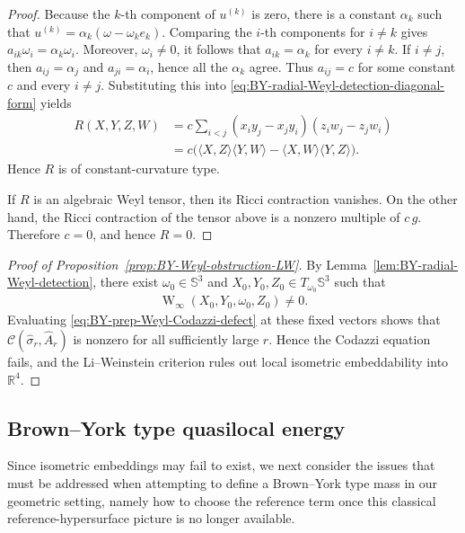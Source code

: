 \documentclass[10pt]{amsart}
\newcommand{\R}{\mathbb{R}}
\newcommand{\Sph}{\mathbb{S}}
\newcommand{\Weyl}{\operatorname{W}}
\theoremstyle{plain}
\theoremstyle{remark}
\begin{document}
\begin{proof}
		Because the $k$-th component of $u^{(k)}$ is zero, there is a constant
		$\alpha_k$ such that $u^{(k)}=\alpha_k(\omega-\omega_k e_k)$. Comparing
		the $i$-th components for $i\neq k$ gives
		$a_{ik}\omega_i=\alpha_k\omega_i$. Moreover, $\omega_i\neq0$, it follows
		that $a_{ik}=\alpha_k$ for every $i\neq k$. If $i\neq j$, then $a_{ij}=\alpha_j$ and
		$a_{ji}=\alpha_i$, hence all the $\alpha_k$ agree.
		Thus $a_{ij}=c$ for some constant $c$ and every $i\neq j$. Substituting
		this into \eqref{eq:BY-radial-Weyl-detection-diagonal-form} yields
		\begin{align*}
			R(X,Y,Z,W)
			&=
			c\sum_{i<j}
			(x_i y_j-x_j y_i)
			(z_i w_j-z_j w_i) \\
			&=
			c\bigl(
			\langle X,Z\rangle\langle Y,W\rangle
			-
			\langle X,W\rangle\langle Y,Z\rangle
			\bigr).
		\end{align*}
		Hence $R$ is of constant-curvature type.
		
		If $R$ is an algebraic Weyl tensor, then its Ricci contraction vanishes.
		On the other hand, the Ricci contraction of the tensor above is a
		nonzero multiple of $c\,g$. Therefore $c=0$, and hence $R=0$.
	\end{proof}
	
	
	\begin{proof}[Proof of Proposition~\ref{prop:BY-Weyl-obstruction-LW}]
		By Lemma~\ref{lem:BY-radial-Weyl-detection}, there exist
		$\omega_0\in\Sph^3$ and
		$X_0,Y_0,Z_0\in T_{\omega_0}\Sph^3$ such that
		\begin{align*}
			\Weyl_\infty(X_0,Y_0,\omega_0,Z_0)\neq0.
		\end{align*}
		Evaluating \eqref{eq:BY-prep-Weyl-Codazzi-defect} at these fixed vectors
		shows that $\mathcal C(\hat\sigma_r,\hat A_r)$ is nonzero for all
		sufficiently large $r$.  Hence the Codazzi equation fails, and the
		Li--Weinstein criterion rules out local isometric embeddability into
		$\R^4$.
	\end{proof}
	
	\subsection{Brown--York type quasilocal energy}
	
	Since isometric embeddings may fail to exist, we next consider the issues that must be addressed when attempting to define a Brown--York type mass in our geometric setting, namely how to choose the reference term once this classical
	reference-hypersurface picture is no longer available.
	
\end{document}
